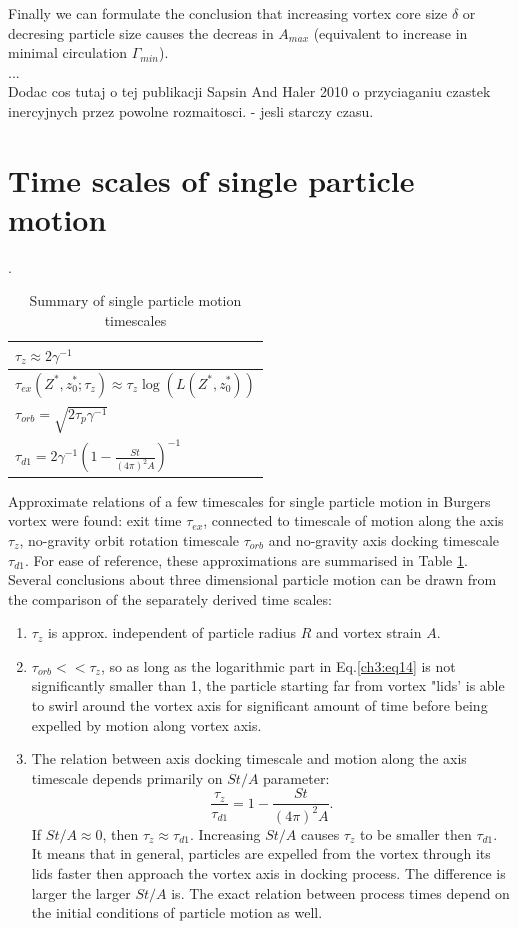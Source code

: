 \documentclass[../main.tex]{subfiles}
\begin{document}
Finally we can formulate the conclusion that increasing vortex core size $\delta$ or decresing particle size causes the decreas in $A_{max}$ (equivalent to increase in minimal circulation $\Gamma_{min}$).\\
...\\
Dodac cos tutaj o tej publikacji Sapsin And Haler 2010 o przyciaganiu czastek inercyjnych przez powolne rozmaitosci. - jesli starczy czasu.

\section{Time scales of single particle motion}

\begin{table}
\small
\tabcolsep=0.2cm
\caption{Summary of single particle motion timescales}.
\centering
\begin{tabular}{|l|}
\hline 
$\tau_z\approx 2\gamma^{-1}$\\
\hline 
$\tau_{ex}(Z^\ast,z_0^\ast; \tau_z)\approx \tau_z \log\left(L(Z^\ast,z_0^\ast)\right)$\\
\hline 
$\tau_{orb}=\sqrt{2 \tau_p \gamma^{-1}}$\\
\hline
$\tau_{d1} =2 \gamma^{-1} \left(1-\frac{St}{(4\pi)^{2} A}\right)^{-1}$\\
\hline
\end{tabular}
\label{tab:ch3_5}
\end{table}

Approximate relations of a few timescales for single particle motion in Burgers vortex were found: exit time $\tau_{ex}$, connected to timescale of motion along the axis $\tau_z$, no-gravity orbit rotation timescale $\tau_{orb}$ and no-gravity axis docking timescale $\tau_{d1}$. For ease of reference, these approximations are summarised in Table \ref{tab:ch3_5}. Several conclusions about three dimensional particle motion can be drawn from the comparison of the separately derived time scales:
\begin{enumerate}
\item $\tau_z$ is approx. independent of particle radius $R$ and vortex strain $A$.
\item $\tau_{orb}<<\tau_z$, so as long as the logarithmic part in Eq.\ref{ch3:eq14} is not significantly smaller than 1, the particle starting far from vortex "lids' is able to swirl around the vortex axis for significant amount of time before being expelled by motion along vortex axis.
\item The relation between axis docking timescale and motion along the axis timescale depends primarily on $St/A$ parameter:
\begin{equation}
\frac{\tau_z}{\tau_{d1}} = 1-\frac{St}{(4 \pi)^2 A}.
\label{ch3:eq33}
\end{equation}
If $St/A \approx 0$, then $\tau_z \approx \tau_{d1}$. Increasing $St/A$ causes $\tau_z$ to be smaller then $\tau_{d1}$. It means that in general, particles are expelled from the vortex  through its lids faster then approach the vortex axis in docking process. The difference is larger the larger $St/A$ is. The exact relation between process times depend on the initial conditions of particle motion as well.
\end{enumerate} 
\end{document}
